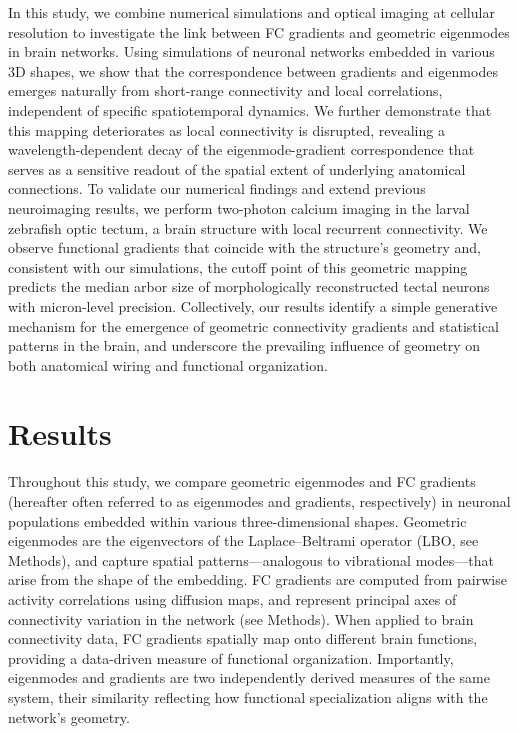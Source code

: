\documentclass{article}
\begin{document}
In this study, we combine numerical simulations and optical imaging at cellular resolution to investigate the link between FC gradients and geometric eigenmodes in brain networks. Using simulations of neuronal networks embedded in various 3D shapes, we show that the correspondence between gradients and eigenmodes emerges naturally from short-range connectivity and local correlations, independent of specific spatiotemporal dynamics. We further demonstrate that this mapping deteriorates as local connectivity is disrupted, revealing a wavelength-dependent decay of the eigenmode-gradient correspondence that serves as a sensitive readout of the spatial extent of underlying anatomical connections. To validate our numerical findings and extend previous neuroimaging results\cite{pang2023geometric}, we perform two-photon calcium imaging in the larval zebrafish optic tectum, a brain structure with local recurrent connectivity. We observe functional gradients that coincide with the structure’s geometry and, consistent with our simulations, the cutoff point of this geometric mapping predicts the median arbor size of morphologically reconstructed tectal neurons with micron-level precision\cite{kunst2019cellular}. Collectively, our results identify a simple generative mechanism for the emergence of geometric connectivity gradients and statistical patterns in the brain, and underscore the prevailing influence of geometry on both anatomical wiring and functional organization.

\section*{Results}

Throughout this study, we compare geometric eigenmodes and FC gradients (hereafter often referred to as eigenmodes and gradients, respectively) in neuronal populations embedded within various three-dimensional shapes. Geometric eigenmodes are the eigenvectors of the Laplace–Beltrami operator (LBO, see Methods), and capture spatial patterns---analogous to vibrational modes---that arise from the shape of the embedding. FC gradients are computed from pairwise activity correlations using diffusion maps\cite{Coifman2006}, and represent principal axes of connectivity variation in the network (see Methods). When applied to brain connectivity data, FC gradients spatially map onto different brain functions, providing a data-driven measure of functional organization\cite{margulies2016situating}. Importantly, eigenmodes and gradients are two independently derived measures of the same system, their similarity reflecting how functional specialization aligns with the network's geometry. 
\end{document}
